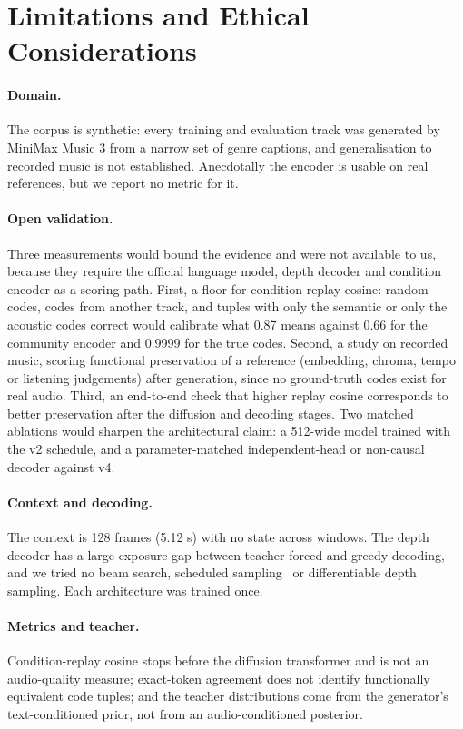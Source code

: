 \section{Limitations and Ethical Considerations}
\label{sec:limitations}

\paragraph{Domain.} The corpus is synthetic: every training and evaluation track was generated by MiniMax Music 3 from a narrow set of genre captions, and generalisation to recorded music is not established. Anecdotally the encoder is usable on real references, but we report no metric for it.

\paragraph{Open validation.} Three measurements would bound the evidence and were not available to us, because they require the official language model, depth decoder and condition encoder as a scoring path. First, a floor for condition-replay cosine: random codes, codes from another track, and tuples with only the semantic or only the acoustic codes correct would calibrate what 0.87 means against 0.66 for the community encoder and 0.9999 for the true codes. Second, a study on recorded music, scoring functional preservation of a reference (embedding, chroma, tempo or listening judgements) after generation, since no ground-truth codes exist for real audio. Third, an end-to-end check that higher replay cosine corresponds to better preservation after the diffusion and decoding stages. Two matched ablations would sharpen the architectural claim: a 512-wide model trained with the v2 schedule, and a parameter-matched independent-head or non-causal decoder against v4.

\paragraph{Context and decoding.} The context is 128 frames (5.12 s) with no state across windows. The depth decoder has a large exposure gap between teacher-forced and greedy decoding, and we tried no beam search, scheduled sampling~\cite{bengio2015scheduled} or differentiable depth sampling. Each architecture was trained once.

\paragraph{Metrics and teacher.} Condition-replay cosine stops before the diffusion transformer and is not an audio-quality measure; exact-token agreement does not identify functionally equivalent code tuples; and the teacher distributions come from the generator's text-conditioned prior, not from an audio-conditioned posterior.

